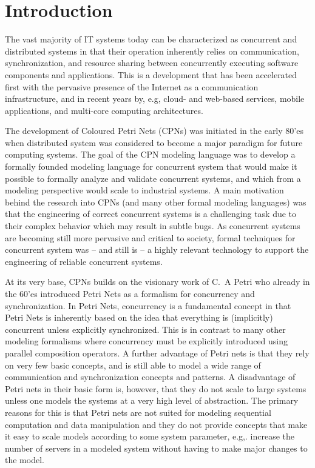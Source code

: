 \section{Introduction}

The vast majority of IT systems today can be characterized as
concurrent and distributed systems in that their operation inherently
relies on communication, synchronization, and resource sharing between
concurrently executing software components and applications. This is a
development that has been accelerated first with the pervasive
presence of the Internet as a communication infrastructure, and in
recent years by, e.g, cloud- and web-based services, mobile
applications, and multi-core computing architectures.


The development of Coloured Petri Nets (CPNs) was initiated in the
early 80'es when distributed system was considered to become a major
paradigm for future computing systems. The goal of the CPN modeling
language was to develop a formally founded modeling language for
concurrent system that would make it possible to formally analyze and
validate concurrent systems, and which from a modeling perspective
would scale to industrial systems. A main motivation behind the
research into CPNs (and many other formal modeling languages) was
that the engineering of correct concurrent systems is a challenging
task due to their complex behavior which may result in subtle bugs. As
concurrent systems are becoming still more pervasive and critical to
society, formal techniques for concurrent system was -- and still is
-- a highly relevant technology to support the engineering of reliable
concurrent systems.


At its very base, CPNs builds on the visionary work of C.~A Petri
\cite{capetri:thesis} who already in the 60'es introduced Petri Nets
as a formalism for concurrency and synchronization. In Petri Nets,
concurrency is a fundamental concept in that Petri Nets is inherently
based on the idea that everything is (implicitly) concurrent unless
explicitly synchronized. This is in contrast to many other modeling
formalisms where concurrency must be explicitly introduced using
parallel composition operators. A further advantage of Petri nets is
that they rely on very few basic concepts, and is still able to model
a wide range of communication and synchronization concepts and
patterns. A disadvantage of Petri nets in their basic form is,
however, that they do not scale to large systems unless one models the
systems at a very high level of abstraction. The primary reasons for
this is that Petri nets are not suited for modeling sequential
computation and data manipulation and they do not provide concepts
that make it easy to scale models according to some system parameter,
e.g,. increase the number of servers in a modeled system without
having to make major changes to the model.

